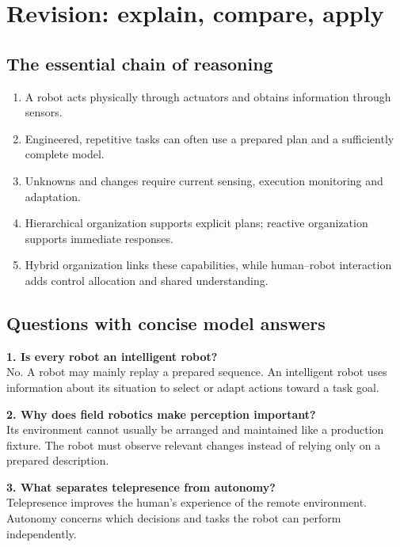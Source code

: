 \section{Revision: explain, compare, apply}
\subsection{The essential chain of reasoning}
\begin{enumerate}
\item A robot acts physically through actuators and obtains information through sensors.
\item Engineered, repetitive tasks can often use a prepared plan and a sufficiently complete model.
\item Unknowns and changes require current sensing, execution monitoring and adaptation.
\item Hierarchical organization supports explicit plans; reactive organization supports immediate responses.
\item Hybrid organization links these capabilities, while human--robot interaction adds control allocation and shared understanding.
\end{enumerate}

\subsection{Questions with concise model answers}
\begin{samepage}\textbf{1. Is every robot an intelligent robot?}\\
No. A robot may mainly replay a prepared sequence. An intelligent robot uses information about its situation to select or adapt actions toward a task goal.\par\end{samepage}

\begin{samepage}\textbf{2. Why does field robotics make perception important?}\\
Its environment cannot usually be arranged and maintained like a production fixture. The robot must observe relevant changes instead of relying only on a prepared description.\par\end{samepage}

\begin{samepage}\textbf{3. What separates telepresence from autonomy?}\\
Telepresence improves the human's experience of the remote environment. Autonomy concerns which decisions and tasks the robot can perform independently.\par\end{samepage}


